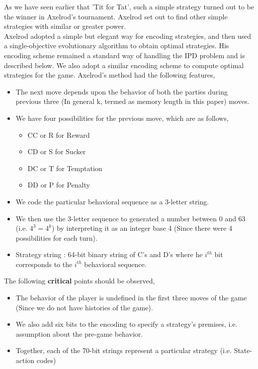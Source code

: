 \documentclass[a4paper]{article}
\begin{document}
As we have seen earlier that 'Tit for Tat', such a simple strategy turned out to be the winner in Axelrod's tournament. Axelrod set out to find other simple strategies with similar or greater power.\\
Axelrod adopted a simple but elegant way for encoding strategies, and then used a single-objective evolutionary algorithm to obtain optimal strategies. His encoding scheme remained a standard way of handling the IPD problem and is described below. We also adopt a similar encoding scheme to compute optimal strategies for the game. Axelrod's method had the following features,
	\begin{itemize}
	\item The next move depends upon the behavior of both the parties during previous three (In general k, termed as memory length in this paper) moves.
	\item We have four possibilities for the previous move, which are as follows,
	\begin{itemize}
		\item CC or R for Reward
		\item CD or S for Sucker
		\item DC or T for Temptation
		\item DD or P for Penalty
	\end{itemize}		
	\item We code the particular behavioral sequence as a 3-letter string.	
	\item We then use the 3-letter sequence to generated a number between 0 and 63 (i.e. $4^{3} = 4^{k}$) by interpreting it as an integer base 4 (Since there were 4 possibilities for each turn).
	\item Strategy string : 64-bit binary string of C's and D's where he $i^{th}$ bit corresponds to the $i^{th}$ behavioral sequence.
	\end{itemize}

	The following \textbf{critical} points should be observed,
	\begin{itemize}
	\item The behavior of the player is undefined in the first three moves of the game (Since we do not have histories of the game).
	\item We also add six bits to the encoding to specify a strategy's premises, i.e. assumption about the pre-game behavior.
	\item Together, each of the 70-bit strings represent a particular strategy (i.e. State-action codes)	
	\end{itemize}		
	
\end{document}
